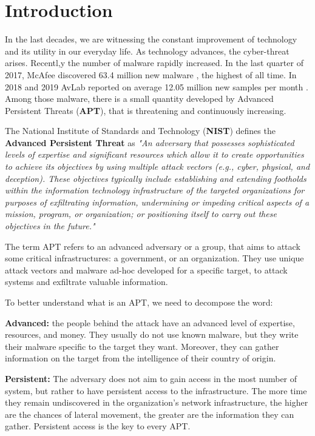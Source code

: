 \chapter{Introduction}

In the last decades, we are witnessing the constant improvement of technology and its utility in our everyday life. As technology advances, the cyber-threat arises.
Recentl,y the number of malware rapidly increased. In the last quarter of 2017, McAfee discovered 63.4 million new malware \cite{mcafee2018}, the highest of all time. In 2018 and 2019 AvLab reported on average 12.05 million new samples per month \cite{avtest2020}. Among those malware, there is a small quantity developed by Advanced Persistent Threats (\textbf{APT}), that is threatening and continuously increasing. 

The National Institute of Standards and Technology (\textbf{NIST}) defines the \textbf{Advanced Persistent Threat} as \cite{nistapt} \textit{"An adversary that possesses sophisticated levels of expertise and significant resources which allow it to create opportunities to achieve its objectives by using multiple attack vectors (e.g., cyber, physical, and deception). These objectives typically include establishing and extending footholds within the information technology infrastructure of the targeted organizations for purposes of exfiltrating information, undermining or impeding critical aspects of a mission, program, or organization; or positioning itself to carry out these objectives in the future."}

The term APT refers to an advanced adversary or a group, that aims to attack some critical infrastructures: a government, or an organization. They use unique attack vectors and malware ad-hoc developed for a specific target, to attack systems and exfiltrate valuable information.

To better understand what is an APT, we need to decompose the word: \cite{apt_def}

\textbf{Advanced:} the people behind the attack have an advanced level of expertise, resources, and money. They usually do not use known malware, but they write their malware specific to the target they want. Moreover, they can gather information on the target from the intelligence of their country of origin.

\textbf{Persistent:}  The adversary does not aim to gain access in the most number of system, but rather to have persistent access to the infrastructure. The more time they remain undiscovered in the organization's network infrastructure, the higher are the chances of lateral movement, the greater are the information they can gather. Persistent access is the key to every APT.

